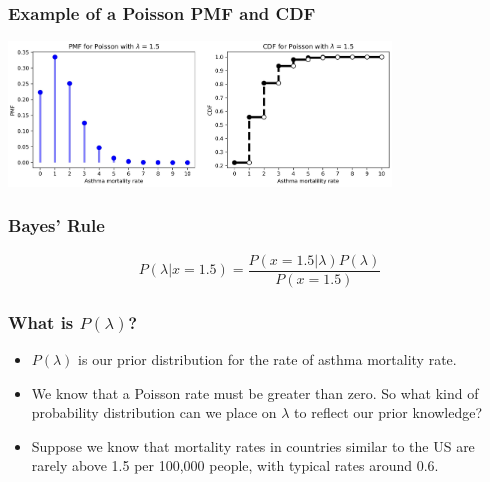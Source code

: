 \documentclass{beamer}
\begin{document}
\begin{frame}
\frametitle{Example of a Poisson PMF and CDF}

\begin{center}
\includegraphics[width=4in]{poisson_pfm_cdf.jpg}
\end{center}

\end{frame}


\begin{frame}
\frametitle{Bayes' Rule}

\begin{equation}
	P(\lambda | x = 1.5) = \frac{P(x=1.5| \lambda) P(\lambda)}{P(x=1.5)}
\end{equation}

\end{frame}

\begin{frame}
\frametitle{What is $P(\lambda)$?}

\begin{itemize}
	\item $P(\lambda)$ is our prior distribution for the rate of asthma mortality rate.
	
	\item We know that a Poisson rate must be greater than zero. So what kind of probability distribution can we place on $\lambda$ to reflect our prior knowledge?
	
	\item Suppose we know that mortality rates in countries similar to the US are rarely above 1.5 per 100,000 people, with typical rates around 0.6. 

\end{itemize}

\end{frame}
\end{document}

